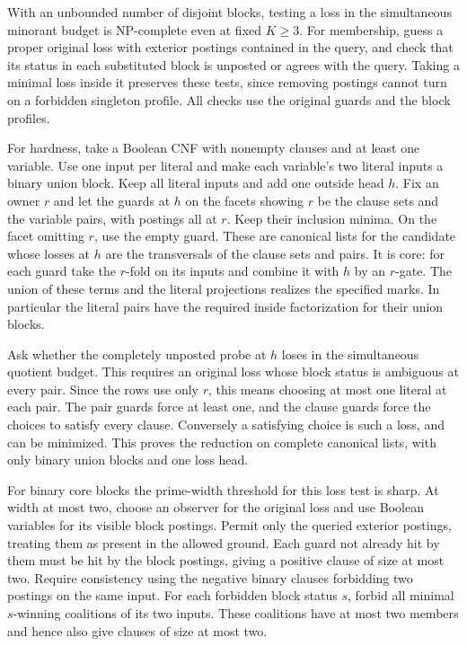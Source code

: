With an unbounded number of disjoint blocks,
testing a loss in the simultaneous minorant budget
is NP-complete even at fixed $K\ge3$. For membership,
guess a proper original loss with exterior postings
contained in the query, and check that its status
in each substituted block is unposted or agrees with
the query. Taking a minimal loss inside it preserves
these tests, since removing postings cannot turn on
a forbidden singleton profile. All checks use the
original guards and the block profiles.

For hardness, take a Boolean CNF with nonempty
clauses and at least one variable. Use one input per
literal and make each variable's two literal inputs
a binary union block. Keep all literal inputs and
add one outside head $h$. Fix an owner $r$ and let
the guards at $h$ on the facets showing $r$ be the
clause sets and the variable pairs, with postings
all at $r$. Keep their inclusion minima. On the
facet omitting $r$, use the empty guard. These
are canonical lists for the candidate whose losses
at $h$ are the transversals of the clause sets
and pairs. It is core: for each guard take the
$r$-fold on its inputs and combine it with $h$ by
an $r$-gate. The union of these terms and the
literal projections realizes the specified marks.
In particular the literal pairs have the required
inside factorization for their union blocks.

Ask whether the completely unposted probe at $h$
loses in the simultaneous quotient budget. This
requires an original loss whose block status is
ambiguous at every pair. Since the rows use only
$r$, this means choosing at most one literal at
each pair. The pair guards force at least one, and
the clause guards force the choices to satisfy
every clause. Conversely a satisfying choice is
such a loss, and can be minimized. This proves the
reduction on complete canonical lists, with only
binary union blocks and one loss head.

For binary core blocks the prime-width threshold
for this loss test is sharp. At width at most two,
choose an observer for the original loss and use
Boolean variables for its visible block postings.
Permit only the queried exterior postings, treating
them as present in the allowed ground. Each guard
not already hit by them must be hit by the block
postings, giving a positive clause of size at most
two. Require consistency using the negative binary
clauses forbidding two postings on the same input.
For each forbidden block status $s$, forbid all
minimal $s$-winning coalitions of its two inputs.
These coalitions have at most two members and hence
also give clauses of size at most two.

